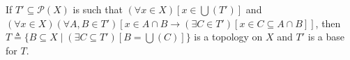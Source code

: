 If $T' \subseteq \mathcal{P}(X)$ is such that $(\forall x \in X)[x \in \bigcup (T')]$ and $(\forall x \in X)(\forall A, B \in T')[x \in A \cap B \rightarrow (\exists C \in T')[x \in C \subseteq A \cap B]]$, then $T \triangleq \{B \subseteq X \mid (\exists C \subseteq T') [B = \bigcup (C)]\}$ is a topology on $X$ and $T'$ is a base for $T$.
